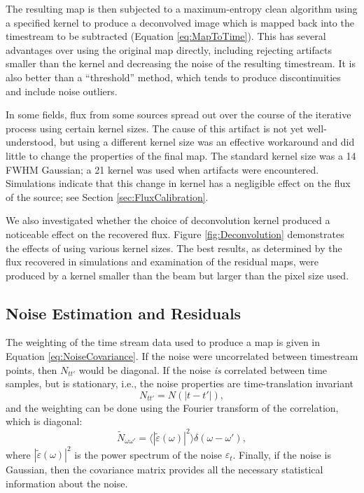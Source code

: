 \documentclass[12pt,preprint]{aastex}
\newcommand{\ie}{{i.e.\/}}
\newcommand{\epsi}{\varepsilon}
\begin{document}
The resulting map is then subjected to a maximum-entropy clean
algorithm \citep{hollis92} using a specified kernel to produce a
deconvolved image which is mapped back into the timestream to be
subtracted (Equation \ref{eq:MapToTime}).  This has several advantages
over using the original map directly, including rejecting artifacts
smaller than the kernel and decreasing the noise of the resulting
timestream.  It is also better than a ``threshold'' method, which
tends to produce discontinuities and include noise outliers.

In some fields, flux from some sources spread out over the course of
the iterative process using certain kernel sizes.  The cause of this
artifact is not yet well-understood, but using a different kernel size
was an effective workaround and did little to change the properties of
the final map.  The standard kernel size was a 14 FWHM
Gaussian; a 21 kernel was used when artifacts were encountered.
Simulations indicate that this change in kernel has a negligible
effect on the flux of the source; see Section
\ref{sec:FluxCalibration}.

We also investigated whether the choice of deconvolution kernel
produced a noticeable effect on the recovered flux.  Figure
\ref{fig:Deconvolution} demonstrates the effects of using various
kernel sizes.  The best results, as determined by the flux recovered
in simulations and examination of the residual maps, were produced by
a kernel smaller than the beam but larger than the pixel size used.

\subsection{Noise Estimation and Residuals}
\label{sec:Noise}

The weighting of the time stream data used to produce a map is given
in Equation \ref{eq:NoiseCovariance}.  If the noise were uncorrelated
between timestream points, then $N_{tt'}$ would be diagonal.  If the
noise {\it is} correlated between time samples, but is stationary,
\ie, the noise properties are time-translation invariant
\begin{equation}
N_{tt'} = N(|t-t'|),
\end{equation}
and the weighting can be done using the Fourier transform of the
correlation, which is diagonal:
\begin{equation}
\tilde{N}_{\omega \omega'} = 
\langle |\tilde{\epsi}(\omega)|^2 \rangle \delta(\omega - \omega'),
\end{equation}
where $|\tilde{\epsi}(\omega)|^2$ is the power spectrum of the noise
$\epsi_t$.  
Finally, if the noise is Gaussian, then the covariance matrix
provides all the necessary statistical information about the noise.
\end{document}
